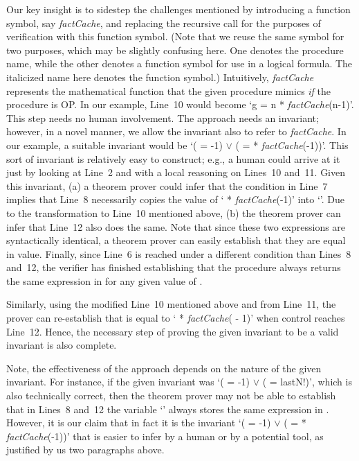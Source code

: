 Our key insight is to sidestep the challenges mentioned by introducing a
function symbol, say \emph{factCache}, and replacing the recursive call for the purposes
of verification with this function symbol. (Note that we reuse the same symbol for two purposes,
which may be slightly confusing here. One denotes the procedure name, while the other
denotes a function symbol for use in a logical formula. The italicized name here denotes the
function symbol.)  Intuitively, \emph{factCache} represents the
mathematical function that the given procedure mimics \emph{if} the procedure is
OP.  In our example, Line~10 would become `g = n * \emph{factCache}(n-1)'. This step
needs no human involvement. The approach needs an invariant; however, in a
novel manner, we allow the invariant also to refer to \emph{factCache}. In our example,
a suitable invariant would be `( = -1) $\vee$ ( =  *
\emph{factCache}(-1))'. This sort of invariant is relatively easy to construct;
e.g., a human could arrive at it just by looking at Line~2 and with a local
reasoning on Lines~10 and~11. Given this invariant, (a) a theorem prover
could infer that the condition in Line~7 implies that Line~8 necessarily
copies the value of ` * \emph{factCache}(-1)' into `'. Due to the transformation to Line~10 mentioned above,
(b) the theorem prover can infer that Line~12 also does the same. Note that since these two expressions are syntactically
identical, a theorem prover can easily establish that they are equal in
value.  Finally, since Line~6 is reached under a different condition than
Lines~8 and~12, the verifier has finished establishing that the procedure
always returns the same expression in  for any given value of .

Similarly, using the modified Line~10 mentioned above and from Line~11, the
prover can re-establish that  is equal to ` * \emph{factCache}( - 1)' when
control reaches Line~12. Hence, the necessary step of proving the given
invariant to be a valid invariant is also complete. 

Note, the effectiveness of the approach depends on the nature of the given
invariant. For instance, if the given invariant was `( = -1) $\vee$ ( =
lastN!)', which is also technically correct, then the theorem prover may
not be able to establish that in Lines~8 and~12 the variable `' always
stores the same expression in . However, it is our claim that in fact it is the
invariant `( = -1) $\vee$ ( =  * \emph{factCache}(-1))' that is
easier to infer by a human or by a potential tool, as justified by us two
paragraphs above.

